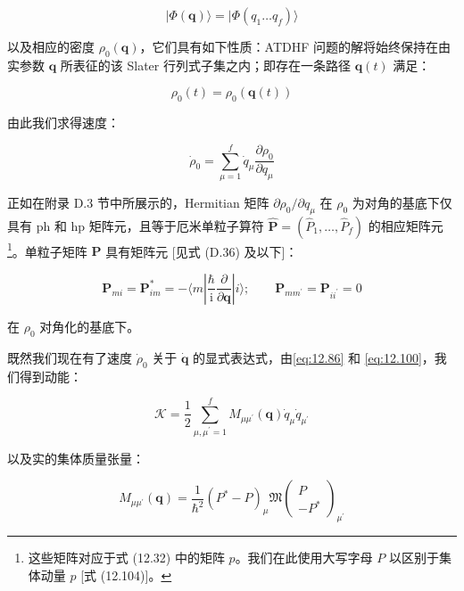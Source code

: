 \begin{equation}
|\Phi(\boldsymbol{q})\rangle=|\Phi(q_{1}\dots q_{f})\rangle\label{eq:12.98}
\end{equation}

以及相应的密度 $\rho_{0}(\boldsymbol{q})$，它们具有如下性质：ATDHF 问题的解将始终保持在由实参数
$\boldsymbol{q}$ 所表征的该 Slater 行列式子集之内；即存在一条路径 $\boldsymbol{q}(t)$
满足：

\begin{equation}
\rho_{0}(t)=\rho_{0}(\boldsymbol{q}(t))\label{eq:12.99}
\end{equation}

由此我们求得速度：

\begin{equation}
\dot{\rho}_{0}=\sum^{f}_{\mu=1}\dot{q}_{\mu}\frac{\partial\rho_{0}}{\partial q_{\mu}}\label{eq:12.100}
\end{equation}

正如在附录 D.3 节中所展示的，Hermitian 矩阵 $\partial\rho_{0}/\partial q_{\mu}$
在 $\rho_{0}$ 为对角的基底下仅具有 ph 和 hp 矩阵元，且等于厄米单粒子算符 $\hat{\boldsymbol{P}}=(\hat{P}_{1},\dots,\hat{P}_{f})$
的相应矩阵元\footnote{这些矩阵对应于式 (12.32) 中的矩阵 $p$。我们在此使用大写字母 $P$ 以区别于集体动量 $p$ {[}式 (12.104){]}。}。单粒子矩阵
$\boldsymbol{P}$ 具有矩阵元 {[}见式 (D.36) 及以下{]}：

\begin{equation}
\boldsymbol{P}_{mi}=\boldsymbol{P}^{*}_{im}=-\langle m|\frac{\hbar}{\mathrm{i}}\frac{\partial}{\partial\boldsymbol{q}}|i\rangle;\qquad\boldsymbol{P}_{mm^{\prime}}=\boldsymbol{P}_{ii^{\prime}}=0\label{eq:12.101}
\end{equation}

在 $\rho_{0}$ 对角化的基底下。

既然我们现在有了速度 $\dot{\rho}_{0}$ 关于 $\dot{\boldsymbol{q}}$ 的显式表达式，由\ref{eq:12.86}
和 \ref{eq:12.100}，我们得到动能：

\begin{equation}
\mathcal{K}=\frac{1}{2}\sum^{f}_{\mu,\mu^{\prime}=1}M_{\mu\mu^{\prime}}(\boldsymbol{q})\dot{q}_{\mu}\dot{q}_{\mu^{\prime}}\label{eq:12.102}
\end{equation}

以及实的集体质量张量：

\begin{equation}
M_{\mu\mu^{\prime}}(\boldsymbol{q})=\frac{1}{\hbar^{2}}(P^{*}-P)_{\mu}\mathfrak{M}\left(\begin{array}{c}
P\\
-P^{*}
\end{array}\right)_{\mu^{\prime}}\label{eq:12.103}
\end{equation}

